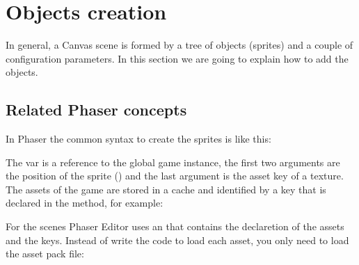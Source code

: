 \documentclass[letterpaper,10pt,english]{sphinxmanual}
\begin{document}
\section{Objects creation}
\label{\detokenize{canvas:objects-creation}}
In general, a Canvas scene is formed by a tree of objects (sprites) and a couple of configuration parameters. In this section we are going to explain how to add the objects.


\subsection{Related Phaser concepts}
\label{\detokenize{canvas:related-phaser-concepts}}
In Phaser the common syntax to create the sprites is like this:

\begin{sphinxVerbatim}[commandchars=\\\{\}]
  
\end{sphinxVerbatim}

The  var is a reference to the global game instance, the first two arguments are the position of the sprite () and the last argument is the asset key of a texture. The assets of the game are stored in a cache and identified by a key that is declared in the  method, for example:

\begin{sphinxVerbatim}[commandchars=\\\{\}]
  
         
\end{sphinxVerbatim}

For the scenes Phaser Editor uses an  that contains the declaretion of the assets and the keys. Instead of write the code to load each asset, you only need to load the asset pack file:

\begin{sphinxVerbatim}[commandchars=\\\{\}]
 
\end{sphinxVerbatim}
\end{document}
